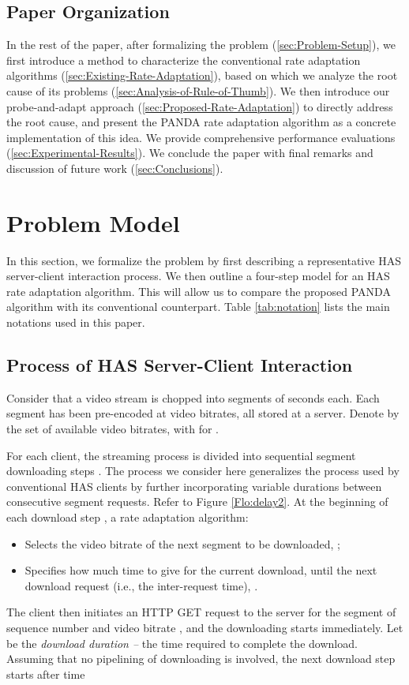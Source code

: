 \documentclass[conference]{IEEEtran}
\theoremstyle{plain}
\theoremstyle{definition}
\theoremstyle{plain}
\theoremstyle{plain}
\begin{document}
\subsection{Paper Organization}

In the rest of the paper, after formalizing the problem (\ref{sec:Problem-Setup}),
we first introduce a method to characterize the conventional rate
adaptation algorithms (\ref{sec:Existing-Rate-Adaptation}),
based on which we analyze the root cause of its problems (\ref{sec:Analysis-of-Rule-of-Thumb}).
We then introduce our probe-and-adapt approach (\ref{sec:Proposed-Rate-Adaptation})
to directly address the root cause, and present the PANDA rate adaptation
algorithm as a concrete implementation of this idea. We provide comprehensive
performance evaluations (\ref{sec:Experimental-Results}). We
conclude the paper with final remarks and discussion of future work
(\ref{sec:Conclusions}).


\section{Problem Model\label{sec:Problem-Setup}}

In this section, we formalize the problem by first describing a representative
HAS server-client interaction process. We then outline a four-step
model for an HAS rate adaptation algorithm. This will allow us to
compare the proposed PANDA algorithm with its conventional counterpart.
Table \ref{tab:notation} lists the main notations used in this paper.


\subsection{Process of HAS Server-Client Interaction}

Consider that a video stream is chopped into segments of  seconds
each. Each segment has been pre-encoded at  video bitrates, all
stored at a server. Denote by 
the set of available video bitrates, with  for
.

For each client, the streaming process is divided into sequential
segment downloading steps . The process we consider here
generalizes the process used by conventional HAS clients by further
incorporating variable durations between consecutive segment requests.
Refer to Figure \ref{Flo:delay2}. At the beginning of each download
step , a rate adaptation algorithm: 
\begin{itemize}
\item Selects the video bitrate of the next segment to be downloaded, ;
\item Specifies how much time to give for the current download, until the
next download request (i.e., the inter-request time), .
\end{itemize}
The client then initiates an HTTP GET request to the server for the
segment of sequence number  and video bitrate , and the
downloading starts immediately. Let  be the\emph{ download
duration --} the time required to complete the download. Assuming
that no pipelining of downloading is involved, the next download step
starts after time 
\end{document}
